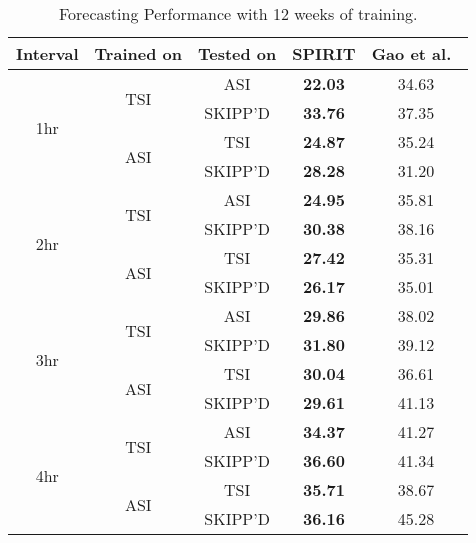 \begin{table}[h]
  \caption{
  Forecasting Performance with 12 weeks of training.
  }
  \label{tab:twelveweek_forecast}
  \centering
  \setlength{\tabcolsep}{2pt}
  \renewcommand{\arraystretch}{1.2} 
  \begin{tabular}{c c c c c}
    \hline
    \textbf{Interval} & \textbf{Trained on} & \textbf{Tested on} & \textbf{SPIRIT} & \textbf{Gao et al.~\cite{wacv2022}} \\
    \hline
    \multirow{4}{*}{1hr} & \multirow{2}{*}{TSI} & ASI & \textbf{22.03} & 34.63 \\
                          & & SKIPP'D & \textbf{33.76} & 37.35 \\
                          \cline{2-5}
                          & \multirow{2}{*}{ASI} & TSI & \textbf{24.87} & 35.24 \\
                          & & SKIPP'D & \textbf{28.28} & 31.20 \\
    \hline
    \multirow{4}{*}{2hr} & \multirow{2}{*}{TSI} & ASI & \textbf{24.95} & 35.81 \\
                          & & SKIPP'D & \textbf{30.38} & 38.16 \\
                          \cline{2-5}
                          & \multirow{2}{*}{ASI} & TSI & \textbf{27.42} & 35.31 \\
                          & & SKIPP'D & \textbf{26.17} & 35.01 \\
    \hline
    \multirow{4}{*}{3hr} & \multirow{2}{*}{TSI} & ASI & \textbf{29.86} & 38.02 \\
                          & & SKIPP'D & \textbf{31.80} & 39.12 \\
                          \cline{2-5}
                          & \multirow{2}{*}{ASI} & TSI & \textbf{30.04} & 36.61 \\
                          & & SKIPP'D & \textbf{29.61} & 41.13 \\
    \hline
    \multirow{4}{*}{4hr} & \multirow{2}{*}{TSI} & ASI & \textbf{34.37} & 41.27 \\
                          & & SKIPP'D & \textbf{36.60} & 41.34 \\
                          \cline{2-5}
                          & \multirow{2}{*}{ASI} & TSI & \textbf{35.71} & 38.67 \\
                          & & SKIPP'D & \textbf{36.16} & 45.28 \\
    \hline
  \end{tabular}
\end{table}

